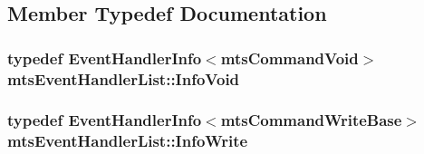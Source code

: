 \subsection{Member Typedef Documentation}
\hypertarget{classmts_event_handler_list_a7b977bcaba00a2616c48b250d02d53d5}{
\subsubsection[{Info\-Void}]{\setlength{\rightskip}{0pt plus 5cm}typedef Event\-Handler\-Info$<${\bf mts\-Command\-Void}$>$ {\bf mts\-Event\-Handler\-List\-::\-Info\-Void}}}\label{classmts_event_handler_list_a7b977bcaba00a2616c48b250d02d53d5}
\hypertarget{classmts_event_handler_list_ac4f93c3df99ddcff2ecc44e52f76ffc8}{
\subsubsection[{Info\-Write}]{\setlength{\rightskip}{0pt plus 5cm}typedef Event\-Handler\-Info$<${\bf mts\-Command\-Write\-Base}$>$ {\bf mts\-Event\-Handler\-List\-::\-Info\-Write}}}\label{classmts_event_handler_list_ac4f93c3df99ddcff2ecc44e52f76ffc8}


